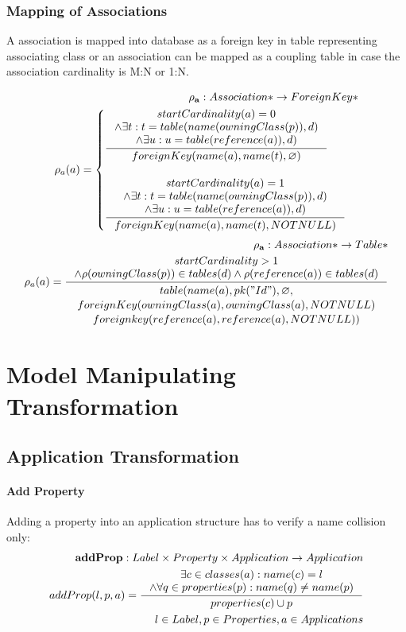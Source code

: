 \documentclass[11pt]{article}
\begin{document}
\subsubsection{Mapping of Associations}
A association is mapped into database as a foreign key in table representing associating class or an association can be mapped as a coupling table in case the association cardinality is M:N or 1:N.

\begin{align*}
	\mathbf{\rho_a} : Association* \rightarrow ForeignKey* \\
	\rho_a(a) = \begin{cases}
		\inference{ startCardinality(a) = 0 \\ \wedge \exists t : t = table(name(owningClass(p)), d) \\ \wedge \exists u : u = table(reference(a)), d)
		}{
			foreignKey(name(a), name(t),  \varnothing) 
	 	}
  \\ \\
 	 \inference{ startCardinality(a) = 1 \\ \wedge \exists t : t = table(name(owningClass(p)), d) \\ \wedge \exists u : u = table(reference(a)), d)
 	 }{ 
		foreignKey(name(a), name(t),  NOTNULL)
	}
	 \end{cases}
\end{align*}
\begin{align*} 
	\mathbf{\rho_a} : Association* \rightarrow Table* \\
  	\rho_a(a) = \inference{  startCardinality > 1 \\ \wedge \rho(owningClass(p)) \in tables(d) \wedge \rho(reference(a)) \in tables(d)
  		}{\begin{gathered}  
		 table(name(a), pk("Id"), \varnothing, \\ foreignKey(owningClass(a),owningClass(a), NOTNULL) \\ foreignkey(reference(a), reference(a), NOTNULL)) 
  		\end{gathered}}  
\end{align*}

\section{Model Manipulating Transformation}
\subsection{Application Transformation}
\paragraph{Add Property}Adding a property into an application structure has to verify a name collision only:
\begin{align*}
 	\mathbf{addProp} : Label \times Property \times Application \rightarrow Application \\
	addProp(l, p, a) = \inference{\exists c \in classes(a) : name(c) = l \\ \wedge \forall q \in  properties(p) : name(q) \neq name(p)}{properties(c) \cup p } \\
	l \in Label, p \in Properties, a \in Applications
\end{align*}
\end{document}
